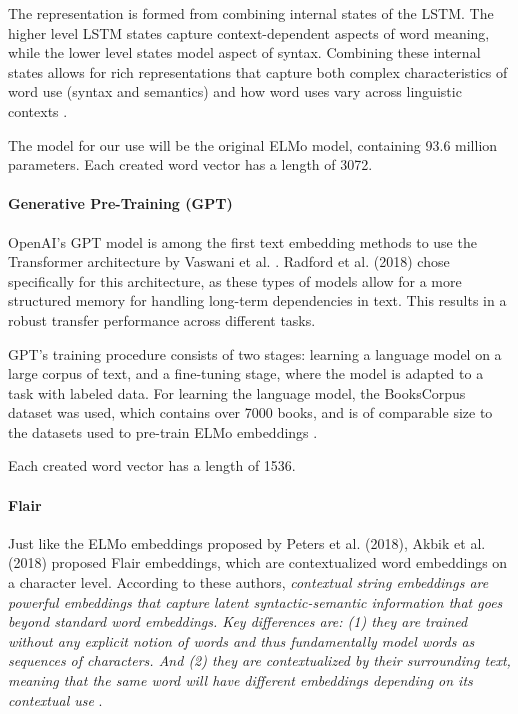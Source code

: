 The representation is formed from combining internal states of the LSTM. 
The higher level LSTM states capture context-dependent aspects of word meaning, while the lower level states model aspect of syntax.
Combining these internal states allows for rich representations that capture both complex characteristics of word use (syntax and semantics) and how word uses vary across linguistic contexts \cite{peters2018}.

The model for our use will be the original ELMo model, containing 93.6 million parameters.
Each created word vector has a length of 3072. 

\paragraph{Generative Pre-Training (GPT)}
OpenAI's GPT model is among the first text embedding methods to use the Transformer architecture by Vaswani et al. \cite{vaswani2017}.
Radford et al. (2018) chose specifically for this architecture, as these types of models allow for a more structured memory for handling long-term dependencies in text.
This results in a robust transfer performance across different tasks. 

GPT's training procedure consists of two stages: learning a language model on a large corpus of text, and a fine-tuning stage, where the model is adapted to a task with labeled data.
For learning the language model, the BooksCorpus dataset was used, which contains over 7000 books, and is of comparable size to the datasets used to pre-train ELMo embeddings \nocite{radford2018}.

Each created word vector has a length of 1536.

\paragraph{Flair}
Just like the ELMo embeddings proposed by Peters et al. (2018)\nocite{peters2018}, Akbik et al. (2018) proposed Flair embeddings, which are contextualized word embeddings on a character level.
According to these authors, \textit{contextual string embeddings are powerful embeddings that capture latent syntactic-semantic information that goes beyond standard word embeddings. 
Key differences are: (1) they are trained without any explicit notion of words and thus fundamentally model words as sequences of characters. 
And (2) they are contextualized by their surrounding text, meaning that the same word will have different embeddings depending on its contextual use} \cite{flairembedding}. 


